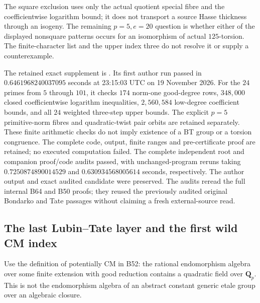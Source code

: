 \begin{remark}
\label{rem:B-RD77-scope}
The square exclusion uses only the actual quotient special fibre
and the coefficientwise logarithm bound; it does not transport a
source Hasse thickness through an isogeny. The remaining
\(p=5,e=20\) question is whether either of the displayed
nonsquare patterns occurs for an isomorphism of actual
\(125\)-torsion. The finite-character list and the upper index
three do not resolve it or supply a counterexample.

The retained exact supplement is
.
Its first author run passed in \(0.6461968240037095\) seconds
at 23:15:03 UTC on 19 November 2026. For the \(24\) primes
from \(5\) through \(101\), it checks \(174\) norm-one
good-degree rows, \(348{,}000\) closed coefficientwise logarithm
inequalities, \(2{,}560{,}584\) low-degree coefficient bounds,
and all \(24\) weighted three-step upper bounds. The explicit
\(p=5\) primitive-norm fibres and quadratic-twist pair orbits
are retained separately. These finite arithmetic checks do
not imply existence of a BT group or a torsion congruence.
The complete code, output, finite ranges and pre-certificate
proof are retained; no executed computation failed.
The complete independent root and companion proof/code audits
passed, with unchanged-program reruns taking
\(0.7250874890014529\) and \(0.630934568005614\) seconds,
respectively. The author output and exact audited candidate
were preserved. The audits reread the full internal B64 and B50
proofs; they reused the previously audited original Bondarko
and Tate passages without claiming a fresh external-source read.
\end{remark}


\subsection{The last Lubin--Tate layer and the first wild CM index}

Use the definition of potentially CM in B52: the rational
endomorphism algebra over some finite extension with good
reduction contains a quadratic field over \(\mathbf Q_p\).
This is not the endomorphism algebra of an abstract constant
generic etale group over an algebraic closure.


